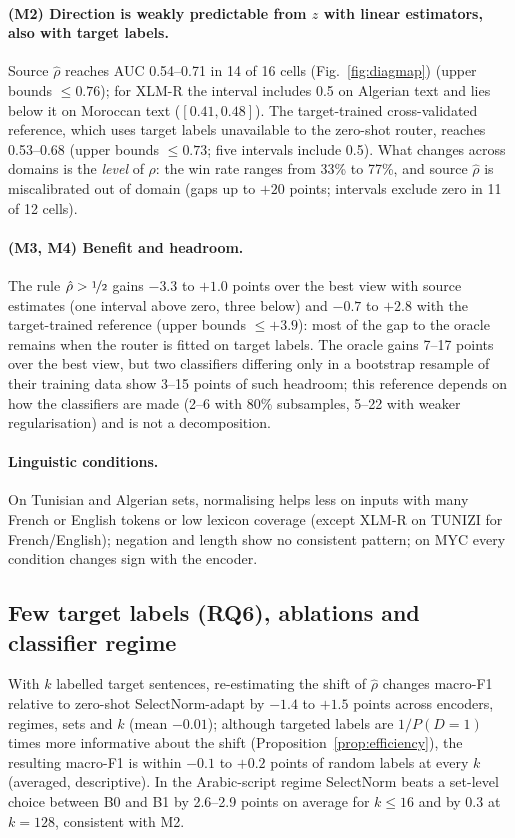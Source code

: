 \paragraph{(M2) Direction is weakly predictable from $z$ with linear estimators, also with target labels.} Source $\hat\rho$ reaches AUC 0.54--0.71 in 14 of 16 cells (Fig.~\ref{fig:diagmap}) (upper bounds $\le0.76$); for XLM-R the interval includes 0.5 on Algerian text and lies below it on Moroccan text ($[0.41,0.48]$). The target-trained cross-validated reference, which uses target labels unavailable to the zero-shot router, reaches 0.53--0.68 (upper bounds $\le0.73$; five intervals include 0.5). What changes across domains is the \emph{level} of $\rho$: the win rate ranges from 33\% to 77\%, and source $\hat\rho$ is miscalibrated out of domain (gaps up to $+20$ points; intervals exclude zero in 11 of 12 cells).

\paragraph{(M3, M4) Benefit and headroom.} The rule $\hat\rho>\nicefrac12$ gains $-3.3$ to $+1.0$ points over the best view with source estimates (one interval above zero, three below) and $-0.7$ to $+2.8$ with the target-trained reference (upper bounds $\le+3.9$): most of the gap to the oracle remains when the router is fitted on target labels. The oracle gains 7--17 points over the best view, but two classifiers differing only in a bootstrap resample of their training data show 3--15 points of such headroom; this reference depends on how the classifiers are made (2--6 with 80\% subsamples, 5--22 with weaker regularisation) and is not a decomposition.

\paragraph{Linguistic conditions.} On Tunisian and Algerian sets, normalising helps less on inputs with many French or English tokens or low lexicon coverage (except XLM-R on TUNIZI for French/English); negation and length show no consistent pattern; on MYC every condition changes sign with the encoder.

\subsection{Few target labels (RQ6), ablations and classifier regime}
\label{sec:fewlabel}
With $k$ labelled target sentences, re-estimating the shift of $\hat\rho$ changes macro-F1 relative to zero-shot SelectNorm-adapt by $-1.4$ to $+1.5$ points across encoders, regimes, sets and $k$ (mean $-0.01$); although targeted labels are $1/P(D{=}1)$ times more informative about the shift (Proposition~\ref{prop:efficiency}), the resulting macro-F1 is within $-0.1$ to $+0.2$ points of random labels at every $k$ (averaged, descriptive). In the Arabic-script regime SelectNorm beats a set-level choice between B0 and B1 by 2.6--2.9 points on average for $k\le16$ and by 0.3 at $k=128$, consistent with M2.

